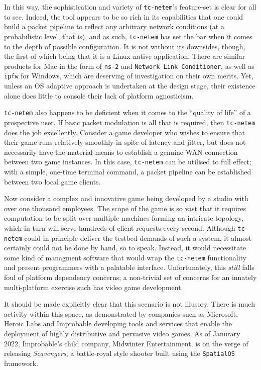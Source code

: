 In this way, the sophistication and variety of \texttt{tc-netem}'s feature-set is clear for all to see. Indeed, the
tool appears to be so rich in its capabilities that one could build a packet pipeline to reflect any arbitrary
network conditions (at a probabilistic level, that is), and as such, \texttt{tc-netem} has set the bar when it comes to
the depth of possible configuration. It is not without its downsides, though, the first of which being that it is a
Linux native application. There are similar products for Mac in the form of \texttt{ns-2}\cite{ns_2_man, ns_2_wiki}
and \texttt{Network Link Conditioner}\cite{nlc}, as well as \texttt{ipfw}\cite{ipfw,ipfw_man} for Windows, which are
deserving of investigation on their own merits. Yet, unless an OS adaptive approach is undertaken at the design
stage, their existence alone does little to console their lack of platform agnosticism.

\texttt{tc-netem} also happens to be deficient when it comes to the ``quality of life'' of a prospective user. If basic
packet modulation is all that is required, then \texttt{tc-netem} does the job excellently. Consider a game developer
who wishes to ensure that their game runs relatively smoothly in spite of latency and jitter, but does not necessarily
have the material means to establish a genuine WAN\cite{wan_cisco} connection between two game instances. In this
case, \texttt{tc-netem} can be utilised to full effect; with a simple, one-time terminal command, a packet pipeline
can be established between two local game clients.

Now consider a complex and innovative game being developed by a
studio with over one thousand employees. The scope of the game is so vast that it requires computation to be split over
multiple machines forming an intricate topology, which in turn will serve hundreds of client requests every second.
Although \texttt{tc-netem} could in principle deliver the testbed demands of such a system, it almost certainly
could not be done by hand, so to speak. Instead, it would necessitate some kind of managment software that would wrap
the \texttt{tc-netem} functionality and present programmers with a palatable interface. Unfortunately, this \emph{still}
falls foul of platform dependency concerns; a non-trivial set of concerns for an innately multi-platform exercise such
has video game development.

It should be made explicitly clear that this scenario is not illusory. There is much activity within this
space, as demonstrated by companies such as Microsoft, Heroic Labs and Improbable developing tools and services that
enable the deployment of highly distributive and pervasive video games\cite{microsoft_playfab, heroic_labs_nakama,
    improbable_spatialos, improbable_spatialos_unreal_gdk_github}. As of Janurary 2022, Improbable's child company,
Midwinter Entertainment, is on the verge of releasing \emph{Scavengers}\cite{improbable_spatialos_scavengers}, a
battle-royal style shooter built using the \texttt{SpatialOS} framework\cite{improbable_spatialos,
    improbable_spatialos_unreal_gdk_github}.


